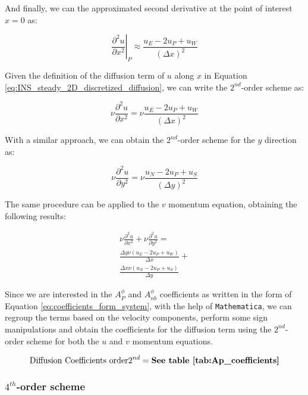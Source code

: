 And finally, we can the approximated second derivative at the point of interest $x = 0$ as:

\begin{equation}
    \left. \frac{\partial^2 u}{\partial x^2} \right|_P \approx \frac{u_{E} - 2 u_{P} + u_{W}}{(\Delta x)^2}
\end{equation}

Given the definition of the diffusion term of $u$ along $x$ in Equation \ref{eq:INS_steady_2D_discretized_diffusion}, we can write the $2^{nd}$-order scheme as:

\begin{equation}
    \nu \frac{\partial^2 u}{\partial x^2} = \nu \frac{u_{E} - 2 u_{P} + u_{W}}{(\Delta x)^2}
\end{equation}

With a similar approach, we can obtain the $2^{nd}$-order scheme for the $y$ direction as:

\begin{equation}
    \nu \frac{\partial^2 u}{\partial y^2} = \nu \frac{u_{N} - 2 u_{P} + u_{S}}{(\Delta y)^2}
\end{equation}

The same procedure can be applied to the $v$ momentum equation, obtaining the following results:

\begin{gather}
    \nu \frac{\partial^2 u}{\partial x^2} + \nu \frac{\partial^2 u}{\partial y^2} = \\
    \frac{\Delta y \nu  (u_{E}-2 u_{P}+u_{W})}{\Delta x} + \\
    \frac{\Delta x \nu  (u_{N}-2 u_{P}+u_{S})}{\Delta y}
\end{gather}

Since we are interested in the $A_P^\phi$ and $A_{nb}^\phi$ coefficients as written in the form of Equation \ref{eq:coefficients_form_system}, with the help of \texttt{Mathematica}, we can regroup the terms based on the velocity components, perform some sign manipulations and obtain the coefficients for the diffusion term using the $2^{nd}$-order scheme for both the $u$ and $v$ momentum equations.

\begin{equation}
    \text{Diffusion Coefficients order} 2^{nd} = { \textbf{See table \ref{tab:Ap_coefficients}} }
\end{equation}



%
%
\subsubsection{$4^{th}$-order scheme}

